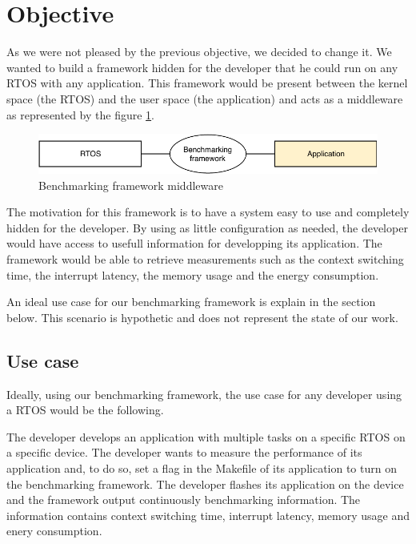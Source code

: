 \section{Objective}

As we were not pleased by the previous objective, we decided to change it.
We wanted to build a framework hidden for the developer that he could run on any RTOS with any application. This framework would be present between the kernel space (the RTOS) and the user space (the application) and acts as a middleware as represented by the figure \ref{fig:bench-framework-layers}.

\begin{figure}[!h]
  \centering
  \includegraphics[scale=1]{assets/bench-framework-layers.pdf}
  \caption{\label{fig:bench-framework-layers}Benchmarking framework middleware}
\end{figure}

The motivation for this framework is to have a system easy to use and completely hidden for the developer.
By using as little configuration as needed, the developer would have access to usefull information for developping its application.
The framework would be able to retrieve measurements such as the context switching time, the interrupt latency, the memory usage and the energy consumption.

An ideal use case for our benchmarking framework is explain in the section below.
This scenario is hypothetic and does not represent the state of our work.

\subsection{Use case}
Ideally, using our benchmarking framework, the use case for any developer using a RTOS would be the following.

The developer develops an application with multiple tasks on a specific RTOS on a specific device.
The developer wants to measure the performance of its application and, to do so, set a flag in the Makefile of its application to turn on the benchmarking framework.
The developer flashes its application on the device and the framework output continuously benchmarking information.
The information contains context switching time, interrupt latency, memory usage and enery consumption.

